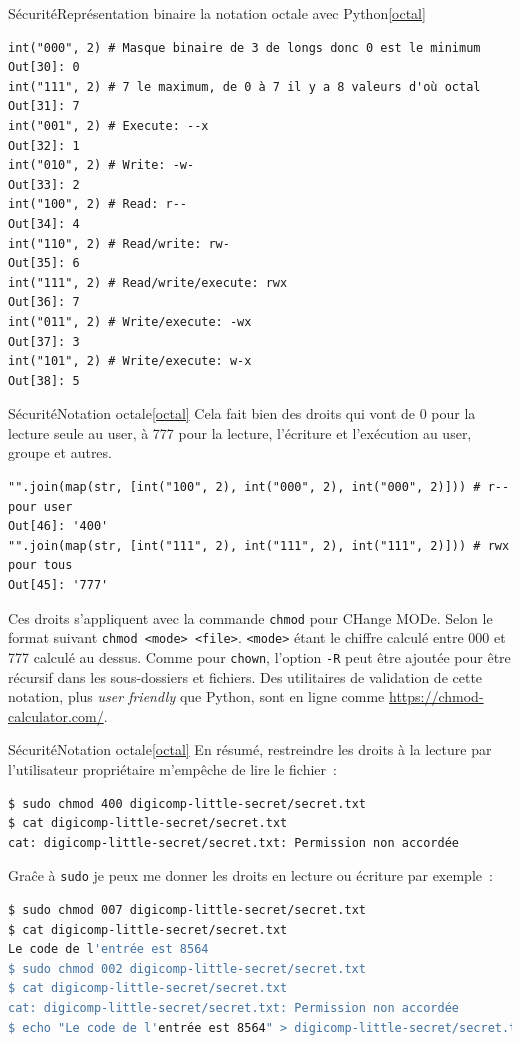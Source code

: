\documentclass{beamer}
\begin{document}
    \begin{frame}[fragile]{Sécurité}{Représentation binaire la notation octale avec Python\cref{octal}}
        \begin{lstlisting}
int("000", 2) # Masque binaire de 3 de longs donc 0 est le minimum
Out[30]: 0
int("111", 2) # 7 le maximum, de 0 à 7 il y a 8 valeurs d'où octal
Out[31]: 7
int("001", 2) # Execute: --x
Out[32]: 1
int("010", 2) # Write: -w-
Out[33]: 2
int("100", 2) # Read: r--
Out[34]: 4
int("110", 2) # Read/write: rw-
Out[35]: 6
int("111", 2) # Read/write/execute: rwx
Out[36]: 7
int("011", 2) # Write/execute: -wx
Out[37]: 3
int("101", 2) # Write/execute: w-x
Out[38]: 5
        \end{lstlisting}
    \end{frame}

    \begin{frame}[fragile]{Sécurité}{Notation octale\cref{octal}}
        Cela fait bien des droits qui vont de 0 pour la lecture seule au user, à 777 pour la lecture, l'écriture et l'exécution au user, groupe et autres.
        \begin{lstlisting}
"".join(map(str, [int("100", 2), int("000", 2), int("000", 2)])) # r-- pour user
Out[46]: '400'
"".join(map(str, [int("111", 2), int("111", 2), int("111", 2)])) # rwx pour tous
Out[45]: '777'
        \end{lstlisting}
        Ces droits s'appliquent avec la commande \lstinline{chmod} pour CHange MODe.
        Selon le format suivant \lstinline{chmod <mode> <file>}.
        \lstinline{<mode>} étant le chiffre calculé entre 000 et 777 calculé au dessus.
        Comme pour \lstinline{chown}, l'option \lstinline{-R} peut être ajoutée pour être récursif dans les sous-dossiers et fichiers.
        \bigbreak
        Des utilitaires de validation de cette notation, plus \textit{user friendly} que Python, sont en ligne comme \url{https://chmod-calculator.com/}.
    \end{frame}

    \begin{frame}[fragile]{Sécurité}{Notation octale\cref{octal}}
        En résumé, restreindre les droits à la lecture par l'utilisateur propriétaire m'empêche de lire le fichier~:
        \begin{lstlisting}[language=bash]
$ sudo chmod 400 digicomp-little-secret/secret.txt
$ cat digicomp-little-secret/secret.txt
cat: digicomp-little-secret/secret.txt: Permission non accordée
        \end{lstlisting}
        Graĉe à \lstinline{sudo} je peux me donner les droits en lecture ou écriture par exemple~:
        \begin{lstlisting}[language=bash]
$ sudo chmod 007 digicomp-little-secret/secret.txt
$ cat digicomp-little-secret/secret.txt
Le code de l'entrée est 8564
$ sudo chmod 002 digicomp-little-secret/secret.txt
$ cat digicomp-little-secret/secret.txt
cat: digicomp-little-secret/secret.txt: Permission non accordée
$ echo "Le code de l'entrée est 8564" > digicomp-little-secret/secret.txt
        \end{lstlisting}
    \end{frame}
\end{document}
